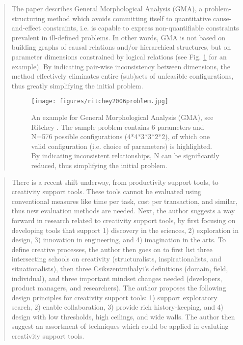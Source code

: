 				
		\begin{quote}
		\small
		The paper describes General Morphological Analysis (GMA), a problem-structuring method
		which avoids committing itself to quantitative cause-and-effect constraints, 
		i.e. is capable to express non-quantifiable constraints prevalent in ill-defined problems.
		In other words, GMA is not based on building graphs of causal relations and/or
		hierarchical structures, but on parameter dimensions constrained by logical relations 
		(see Fig. \ref{fig:ritchey2006problem} for an example).
		By indicating pair-wise inconsistency between dimensions, the method effectively
		eliminates entire (sub)sets of unfeasible configurations, 
		thus greatly simplifying the initial problem.
		\begin{figure}[htb]
		\begin{center}
		\texttt{[image: figures/ritchey2006problem.jpg]}
		\caption{An example for General Morphological Analysis (GMA),
		see Ritchey \cite{ritchey2006problem}. The sample problem contains 6 parameters and
		N=576 possible configurations (4*4*3*3*2*2), of which one valid configuration (i.e. choice of
		parameters) is highlighted. By indicating inconsistent relationships, N can be significantly
		reduced, thus simplifying the initial problem.} 
		\label{fig:ritchey2006problem}
		\end{center}
		\end{figure}						
		\end{quote}

		\begin{quote}
		\small
		There is a recent shift underway, from productivity support tools, to creativity support tools.
		These tools cannot be evaluated using conventional measures like time per task,
		cost per transaction, and similar, thus new evaluation methods are needed.
		Next, the author suggests a way forward in research related to creativity support tools, 
		by first focusing on developing tools
		that support 
		1) discovery in the sciences, 
		2) exploration in design, 
		3) innovation in engineering, and 
		4) imagination in the arts.
		To define creative processes, the author then goes on to first list three intersecting
		schools on creativity (structuralists, inspirationalists, and situationalists),
		then three Csikszentmihalyi's definitions (domain, field, individual),
		and three important mindset changes needed (developers, product managers, and researchers).
		The author proposes the following design principles for creativity support tools:
		1) support exploratory search,
		2) enable collaboration,
		3) provide rich history-keeping, and
		4) design with low thresholds, high ceilings, and wide walls.
		The author then suggest an assortment of techniques which could be applied in
		evaluting creativity support tools.
		\end{quote}

